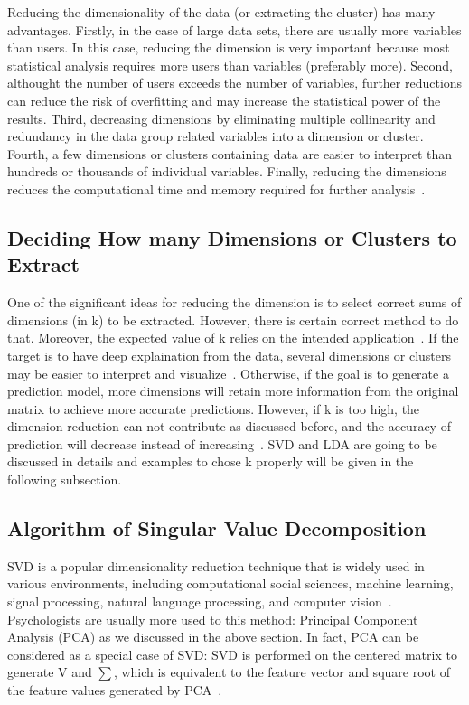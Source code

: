 Reducing the dimensionality of the data (or extracting the cluster)
 has many advantages. 
Firstly, in the case of large data sets, there
 are usually more variables than users. In this case, reducing the
 dimension is very important because most statistical analysis 
requires more users than variables (preferably more). Second, 
althought the number of users exceeds the number of variables, 
further 
reductions can reduce the risk of overfitting and may increase the
 statistical power of the results. Third, decreasing dimensions by 
eliminating multiple collinearity and redundancy in the data group
 related variables into a dimension or cluster. Fourth, a few 
 dimensions or clusters containing data are easier to 
interpret than hundreds or thousands of individual variables. 
Finally, reducing the dimensions reduces the computational time and
 memory required for further analysis~\cite{hid515-12}.

\subsection{Deciding How many Dimensions or Clusters to 
Extract~\cite{hid515-12}}

One of the significant ideas for reducing the dimension is 
to select correct sums of dimensions (in k) to be
 extracted. However, there is certain correct method to do that. 
Moreover, the expected value of k relies on the intended 
application~\cite{hid515-12}. 
If the target is to have deep explaination from the data, several
 dimensions or clusters may be easier to interpret and 
visualize~\cite{hid515-12}. 
Otherwise, if the goal is to generate a prediction model, more
 dimensions will retain more information from the 
original matrix to achieve more accurate 
predictions. However, if k is too high, 
the dimension reduction can not contribute as discussed before, 
and the accuracy of prediction will decrease instead of 
increasing~\cite{hid515-12}. 
SVD and LDA 
are going to be discussed in details and examples to chose k 
properly will be given in the following subsection.

\subsection{Algorithm of Singular Value Decomposition~\cite{hid515-12}}

SVD is a popular dimensionality reduction technique that is widely
 used in various environments, including computational social 
sciences, machine learning, signal processing, natural language 
processing, and computer vision~\cite{hid515-12}. 
Psychologists are usually more
 used to this method: Principal Component Analysis (PCA) as we 
discussed in the above section.
 In fact, PCA can be considered as a special case of SVD: SVD is 
performed on the centered matrix to generate V and $\sum$, 
which is equivalent
 to the feature vector and square root of the feature values 
generated by PCA~\cite{hid515-12}. 

